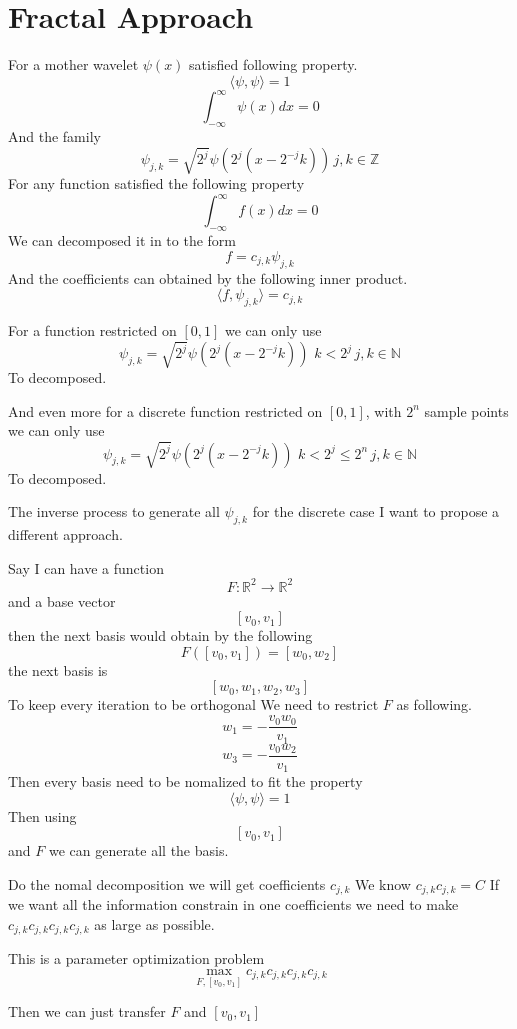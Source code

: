 \documentclass{article}
\theoremstyle{definition} %
\begin{document}
\section{Fractal Approach}
For a mother wavelet \(\psi(x)\) satisfied
following property.
\[
    \langle\psi,\psi\rangle=1
\]
\[
    \int_{-\infty}^{\infty}\psi(x)dx=0
\]
And the family
\[
    \psi_{j,k}=\sqrt{2^j}\psi(2^j(x-2^{-j}k)) \, j,k\in \mathbb{Z}
\]
For any function satisfied
the following property
\[
    \int_{-\infty}^{\infty}f(x)dx=0
\]
We can decomposed it in to the form
\[
    f=c_{j,k}\psi_{j,k}
\]
And the coefficients can obtained by
the following inner product.
\[
    \langle f,\psi_{j,k}\rangle=c_{j,k}
\]

For a function restricted on
\([0,1]\) we can only use
\[
    \psi_{j,k}=\sqrt{2^j}\psi(2^j(x-2^{-j}k)) \,
    \, k<2^j \, j,k\in \mathbb{N}
\]
To decomposed.

And even more for a discrete function restricted on
\([0,1]\), with \(2^n\) sample points we can only use
\[
    \psi_{j,k}=\sqrt{2^j}\psi(2^j(x-2^{-j}k)) \,
    \, k<2^j\leq2^n \, j,k\in \mathbb{N}
\]
To decomposed.

The inverse process to generate all \(\psi_{j,k}\)
for the discrete case I want to propose a different
approach.

Say I can have a function
\[
    F:\mathbb{R}^2\to\mathbb{R}^2
\]
and a base vector
\[
    [v_0,v_1]
\]
then the next basis would obtain by
the following
\[
    F([v_0,v_1])=[w_0,w_2]
\]
the next basis is
\[
    [w_0,w_1,w_2,w_3]
\]
To keep every iteration to be orthogonal
We need to restrict \(F\)
as following.
\[
    w_1=-\frac{v_0w_0}{v_1}
\]
\[
    w_3=-\frac{v_0w_2}{v_1}
\]
Then every basis need to be nomalized
to fit the property
\[
    \langle\psi,\psi\rangle=1
\]
Then using
\[
    [v_0,v_1]
\]
and \(F\)
we can generate all the basis.

Do the nomal decomposition we will
get coefficients \(c_{j,k}\)
We know \(c_{j,k}c_{j,k}=C\)
If we want all the information
constrain in one coefficients
we need to make
\(c_{j,k}c_{j,k}c_{j,k}c_{j,k}\)
as large as possible.

This is a parameter optimization
problem
\[
    \max_{F,[v_0,v_1]}c_{j,k}c_{j,k}c_{j,k}c_{j,k}
\]

Then we can just transfer \(F\) and \([v_0,v_1]\)
\end{document}
